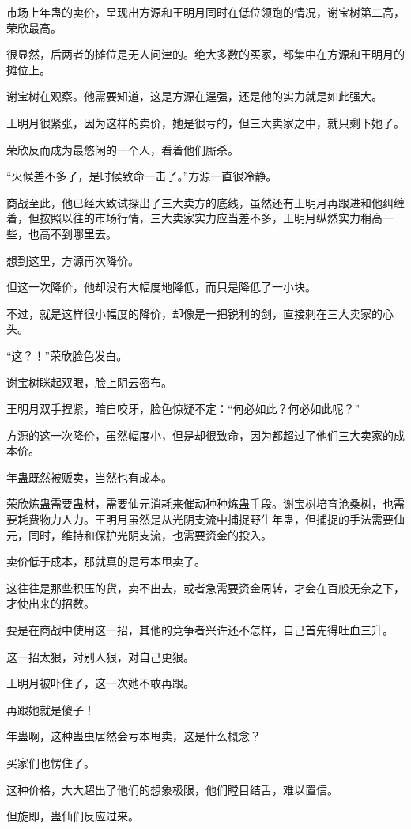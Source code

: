 \begin{this_body}
市场上年蛊的卖价，呈现出方源和王明月同时在低位领跑的情况，谢宝树第二高，荣欣最高。

很显然，后两者的摊位是无人问津的。绝大多数的买家，都集中在方源和王明月的摊位上。

谢宝树在观察。他需要知道，这是方源在逞强，还是他的实力就是如此强大。

王明月很紧张，因为这样的卖价，她是很亏的，但三大卖家之中，就只剩下她了。

荣欣反而成为最悠闲的一个人，看着他们厮杀。

“火候差不多了，是时候致命一击了。”方源一直很冷静。

商战至此，他已经大致试探出了三大卖方的底线，虽然还有王明月再跟进和他纠缠着，但按照以往的市场行情，三大卖家实力应当差不多，王明月纵然实力稍高一些，也高不到哪里去。

想到这里，方源再次降价。

但这一次降价，他却没有大幅度地降低，而只是降低了一小块。

不过，就是这样很小幅度的降价，却像是一把锐利的剑，直接刺在三大卖家的心头。

“这？！”荣欣脸色发白。

谢宝树眯起双眼，脸上阴云密布。

王明月双手捏紧，暗自咬牙，脸色惊疑不定：“何必如此？何必如此呢？”

方源的这一次降价，虽然幅度小，但是却很致命，因为都超过了他们三大卖家的成本价。

年蛊既然被贩卖，当然也有成本。

荣欣炼蛊需要蛊材，需要仙元消耗来催动种种炼蛊手段。谢宝树培育沧桑树，也需要耗费物力人力。王明月虽然是从光阴支流中捕捉野生年蛊，但捕捉的手法需要仙元，同时，维持和保护光阴支流，也需要资金的投入。

卖价低于成本，那就真的是亏本甩卖了。

这往往是那些积压的货，卖不出去，或者急需要资金周转，才会在百般无奈之下，才使出来的招数。

要是在商战中使用这一招，其他的竞争者兴许还不怎样，自己首先得吐血三升。

这一招太狠，对别人狠，对自己更狠。

王明月被吓住了，这一次她不敢再跟。

再跟她就是傻子！

年蛊啊，这种蛊虫居然会亏本甩卖，这是什么概念？

买家们也愣住了。

这种价格，大大超出了他们的想象极限，他们瞠目结舌，难以置信。

但旋即，蛊仙们反应过来。


\end{this_body}
